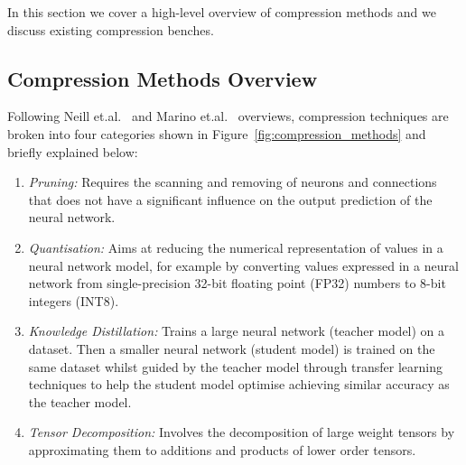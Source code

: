 In this section we cover a high-level overview of compression methods and we discuss existing compression benches.%

\subsection{Compression Methods Overview}
Following Neill et.al.~\cite{Neill2020} and Marino et.al.~\cite{Marino2023} overviews, compression techniques are broken into four categories shown in Figure~\ref{fig:compression_methods} and briefly explained below:
\begin{enumerate}
    \item \textit{Pruning:} Requires the scanning and removing of neurons and connections that does not have a significant influence on the output prediction of the neural network.

    \item \textit{Quantisation:} Aims at reducing the numerical representation of values in a neural network model, for example by converting values expressed in a neural network from single-precision 32-bit floating point (FP32) numbers to 8-bit integers (INT8).

    \item \textit{Knowledge Distillation:} Trains a large neural network (teacher model) on a dataset. Then a smaller neural network (student model) is trained on the same dataset whilst guided by the teacher model through transfer learning techniques to help the student model optimise achieving similar accuracy as the teacher model.

    \item \textit{Tensor Decomposition:} Involves the decomposition of large weight tensors by approximating them to additions and products of lower order tensors.
      
\end{enumerate}


